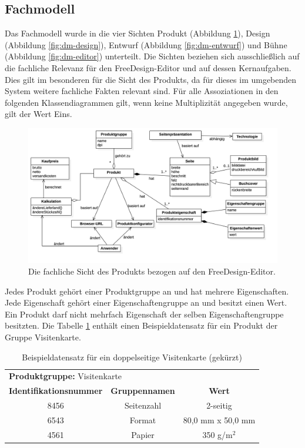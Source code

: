 \subsection{Fachmodell}
Das Fachmodell wurde in die vier Sichten Produkt (Abbildung \ref{fig:dm-product}), Design (Abbildung \ref{fig:dm-design}), Entwurf (Abbildung \ref{fig:dm-entwurf}) und Bühne (Abbildung \ref{fig:dm-editor}) unterteilt. Die Sichten beziehen sich ausschließlich auf die fachliche Relevanz für den FreeDesign-Editor und auf dessen Kernaufgaben. Dies gilt im besonderen für die Sicht des Produkts, da für dieses im umgebenden System weitere fachliche Fakten relevant sind. 
Für alle Assoziationen in den folgenden Klassendiagrammen gilt, wenn keine Multiplizität angegeben wurde, gilt der Wert Eins. 

\begin{figure}[H]
    \centering
    \caption{Die fachliche Sicht des Produkts bezogen auf den FreeDesign-Editor.}
    \label{fig:dm-product}
    \includegraphics[width=1\textwidth]{diagrams/Soll-Architektur/DM-Produktstruktur.png}
\end{figure}

Jedes Produkt gehört einer Produktgruppe an und hat mehrere Eigenschaften. Jede Eigenschaft gehört einer Eigenschaftengruppe an und besitzt einen Wert. Ein Produkt darf nicht mehrfach Eigenschaft der selben Eigenschaftengruppe besitzten. Die Tabelle \ref{table:BspProdukt} enthält einen Beispieldatensatz für ein Produkt der Gruppe Visitenkarte.
\begin{table}[H]
    \centering
    \caption{Beispieldatensatz für ein doppelseitige Visitenkarte (gekürzt)}
    \label{table:BspProdukt}
    \begin{tabular}{c|c|c}
        \multicolumn{3}{l}{\textbf{Produktgruppe:} Visitenkarte}  \\
        \textbf{Identifikationsnummer} & \textbf{Gruppennamen} & \textbf{Wert} \\
        8456 & Seitenzahl & 2-seitig \\
        6543 & Format & 80,0 mm x 50,0 mm \\
        4561 & Papier & 350 g/m$^2$ \\
    \end{tabular}
\end{table}

